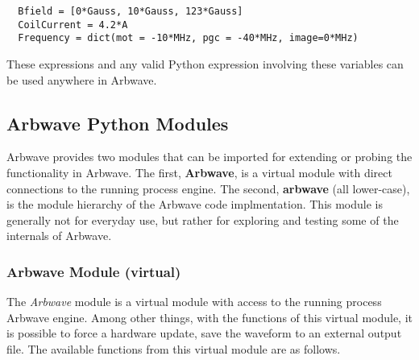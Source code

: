 \begin{lstlisting}
  Bfield = [0*Gauss, 10*Gauss, 123*Gauss]
  CoilCurrent = 4.2*A
  Frequency = dict(mot = -10*MHz, pgc = -40*MHz, image=0*MHz)
\end{lstlisting}

These expressions and any valid Python expression involving these variables
can be used anywhere in Arbwave.


\subsection{Arbwave Python Modules}
Arbwave provides two modules that can be imported for extending or probing the
functionality in Arbwave.  The first, \textbf{Arbwave}, is a virtual module with
direct connections to the running process engine.  The second, \textbf{arbwave}
(all lower-case), is the module hierarchy of the Arbwave code implmentation.
This module is generally not for everyday use, but rather for exploring and
testing some of the internals of Arbwave.

\subsubsection{\textbf{Arbwave} Module (virtual)}
The \textit{Arbwave} module is a virtual module with access to the running
process Arbwave engine.  Among other things, with the functions of this virtual
module, it is possible to force a hardware update, save the waveform to an
external output file.  The available functions from this virtual module are as
follows.

